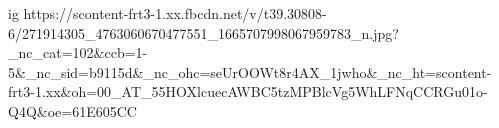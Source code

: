  
 
 
 
 

\ifcmt
  ig https://scontent-frt3-1.xx.fbcdn.net/v/t39.30808-6/271914305_4763060670477551_1665707998067959783_n.jpg?_nc_cat=102&ccb=1-5&_nc_sid=b9115d&_nc_ohc=seUrOOWt8r4AX_1jwho&_nc_ht=scontent-frt3-1.xx&oh=00_AT_55HOXlcuecAWBC5tzMPBlcVg5WhLFNqCCRGu01o-Q4Q&oe=61E605CC
\fi

